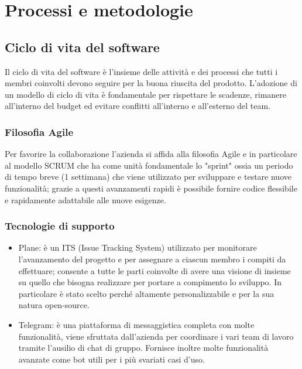 \chapter{Processi e metodologie}
\label{cap:processi-metodologie}



\section{Ciclo di vita del software}
Il ciclo di vita del software è l'insieme delle attività e dei processi che tutti i membri coinvolti devono seguire per la buona riuscita del prodotto.
L'adozione di un modello di ciclo di vita è fondamentale per rispettare le scadenze, rimanere all'interno del budget ed evitare conflitti all'interno e all'esterno del team.

\subsection{Filosofia Agile}
Per favorire la collaborazione l'azienda si affida alla filosofia Agile e in particolare al modello SCRUM che ha come unità fondamentale lo "sprint" ossia un periodo di tempo breve (1 settimana) che viene utilizzato per sviluppare e testare nuove funzionalità; grazie a questi avanzamenti rapidi è possibile fornire codice flessibile e rapidamente adattabile alle nuove esigenze. 

\subsection{Tecnologie di supporto}
\begin{itemize}
    \item Plane: è un ITS (Issue Tracking System) utilizzato per monitorare l'avanzamento del progetto e per assegnare a ciascun membro i compiti da effettuare; consente a tutte le parti coinvolte di avere una visione di insieme su quello che bisogna realizzare per portare a compimento lo sviluppo. In particolare è stato scelto perché altamente personalizzabile e per la sua natura open-source.
    \item Telegram: è una piattaforma di messaggistica completa con molte funzionalità, viene sfruttata dall'azienda per coordinare i vari team di lavoro tramite l'ausilio di chat di gruppo. Fornisce inoltre molte funzionalità avanzate come bot utili per i più svariati casi d'uso.
\end{itemize}

